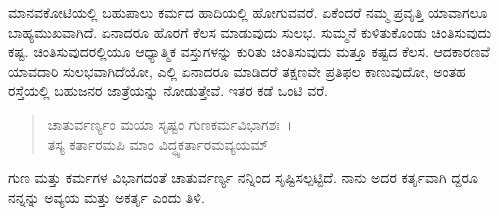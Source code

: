 ಮಾನವಕೋಟಿಯಲ್ಲಿ ಬಹುಪಾಲು ಕರ್ಮದ ಹಾದಿಯಲ್ಲಿ ಹೋಗುವವರೆ. ಏಕೆಂದರೆ ನಮ್ಮ ಪ್ರವೃತ್ತಿ ಯಾವಾಗಲೂ ಬಾಹ್ಯಮುಖವಾಗಿದೆ. ಏನಾದರೂ ಹೊರಗೆ ಕೆಲಸ ಮಾಡುವುದು ಸುಲಭ. ಸುಮ್ಮನೆ ಕುಳಿತುಕೊಂಡು ಚಿಂತಿಸುವುದು ಕಷ್ಟ. ಚಿಂತಿಸುವುದರಲ್ಲಿಯೂ ಆಧ್ಯಾತ್ಮಿಕ ವಸ್ತುಗಳನ್ನು ಕುರಿತು ಚಿಂತಿಸುವುದು ಮತ್ತೂ ಕಷ್ಟದ ಕೆಲಸ. ಆದಕಾರಣವೆ ಯಾವದಾರಿ ಸುಲಭವಾಗಿದೆಯೋ, ಎಲ್ಲಿ ಏನಾದರೂ ಮಾಡಿದರೆ ತಕ್ಷಣವೇ ಪ್ರತಿಫಲ ಕಾಣುವುದೋ, ಅಂತಹ ರಸ್ತೆಯಲ್ಲಿ ಬಹುಜನರ ಜಾತ್ರೆಯನ್ನು ನೋಡುತ್ತೇವೆ. ಇತರ ಕಡೆ ಒಂಟಿ ವರೆ.

\begin{verse}
ಚಾತುರ್ವರ್ಣ್ಯಂ ಮಯಾ ಸೃಷ್ಟಂ ಗುಣಕರ್ಮವಿಭಾಗಶಃ~।\\ತಸ್ಯ ಕರ್ತಾರಮಪಿ ಮಾಂ ವಿದ್ಧ್ಯಕರ್ತಾರಮವ್ಯಯಮ್ 
\end{verse}

{\small ಗುಣ ಮತ್ತು ಕರ್ಮಗಳ ವಿಭಾಗದಂತೆ ಚಾತುರ್ವರ್ಣ್ಯ ನನ್ನಿಂದ ಸೃಷ್ಟಿಸಲ್ಪಟ್ಟಿದೆ. ನಾನು ಅದರ ಕರ್ತೃವಾಗಿ ದ್ದರೂ ನನ್ನನ್ನು ಅವ್ಯಯ ಮತ್ತು ಅಕರ್ತೃ ಎಂದು ತಿಳಿ.}

